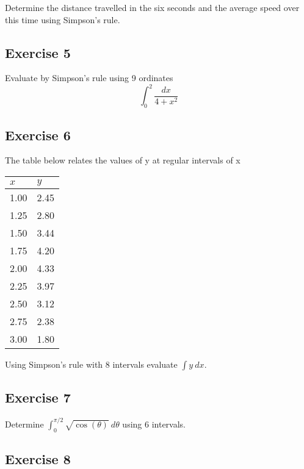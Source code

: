 \documentclass[
  11pt,
  oneside]{book}
\newcommand{\slide}{}
\theoremstyle{definition}
\theoremstyle{definition}
\theoremstyle{definition}
\theoremstyle{definition}
\theoremstyle{remark}
\begin{document}
Determine the distance travelled in the six seconds and the average speed over this time using
Simpson's rule.

\slide

\subsection*{Exercise 5}\label{exercise-5-3}

Evaluate by Simpson's rule using 9 ordinates
\[
\int_0^2\frac{dx}{4+x^2}
\]

\slide

\subsection*{Exercise 6}\label{exercise-6-3}

The table below relates the values of y at regular intervals of x

\begin{tabular}{l|l}
\hline
$x$ & $y$\\
\hline
1.00 & 2.45\\
\hline
1.25 & 2.80\\
\hline
1.50 & 3.44\\
\hline
1.75 & 4.20\\
\hline
2.00 & 4.33\\
\hline
2.25 & 3.97\\
\hline
2.50 & 3.12\\
\hline
2.75 & 2.38\\
\hline
3.00 & 1.80\\
\hline
\end{tabular}

Using Simpson's rule with 8 intervals evaluate \(\displaystyle\int y\ dx\).

\slide

\subsection*{Exercise 7}\label{exercise-7-1}

Determine \(\displaystyle\int_0^{\pi/2}\sqrt{\cos(\theta)}\ d\theta\) using 6 intervals.

\slide

\subsection*{Exercise 8}\label{exercise-8}
\end{document}
